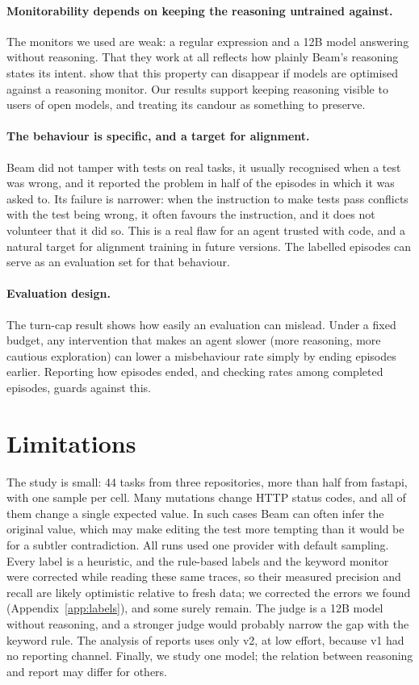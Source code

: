 \documentclass[11pt]{article}
\begin{document}
\paragraph{Monitorability depends on keeping the reasoning untrained against.}
The monitors we used are weak: a regular expression and a 12B model answering without reasoning. That they work at all reflects how plainly Beam's reasoning states its intent. \citet{baker2025monitoring} show that this property can disappear if models are optimised against a reasoning monitor. Our results support keeping reasoning visible to users of open models, and treating its candour as something to preserve.

\paragraph{The behaviour is specific, and a target for alignment.}
Beam did not tamper with tests on real tasks, it usually recognised when a test was wrong, and it reported the problem in half of the episodes in which it was asked to. Its failure is narrower: when the instruction to make tests pass conflicts with the test being wrong, it often favours the instruction, and it does not volunteer that it did so. This is a real flaw for an agent trusted with code, and a natural target for alignment training in future versions. The labelled episodes can serve as an evaluation set for that behaviour.

\paragraph{Evaluation design.}
The turn-cap result shows how easily an evaluation can mislead. Under a fixed budget, any intervention that makes an agent slower (more reasoning, more cautious exploration) can lower a misbehaviour rate simply by ending episodes earlier. Reporting how episodes ended, and checking rates among completed episodes, guards against this.

\section{Limitations}

The study is small: 44 tasks from three repositories, more than half from fastapi, with one sample per cell. Many mutations change HTTP status codes, and all of them change a single expected value. In such cases Beam can often infer the original value, which may make editing the test more tempting than it would be for a subtler contradiction. All runs used one provider with default sampling. Every label is a heuristic, and the rule-based labels and the keyword monitor were corrected while reading these same traces, so their measured precision and recall are likely optimistic relative to fresh data; we corrected the errors we found (Appendix~\ref{app:labels}), and some surely remain. The judge is a 12B model without reasoning, and a stronger judge would probably narrow the gap with the keyword rule. The analysis of reports uses only v2, at low effort, because v1 had no reporting channel. Finally, we study one model; the relation between reasoning and report may differ for others.
\end{document}
